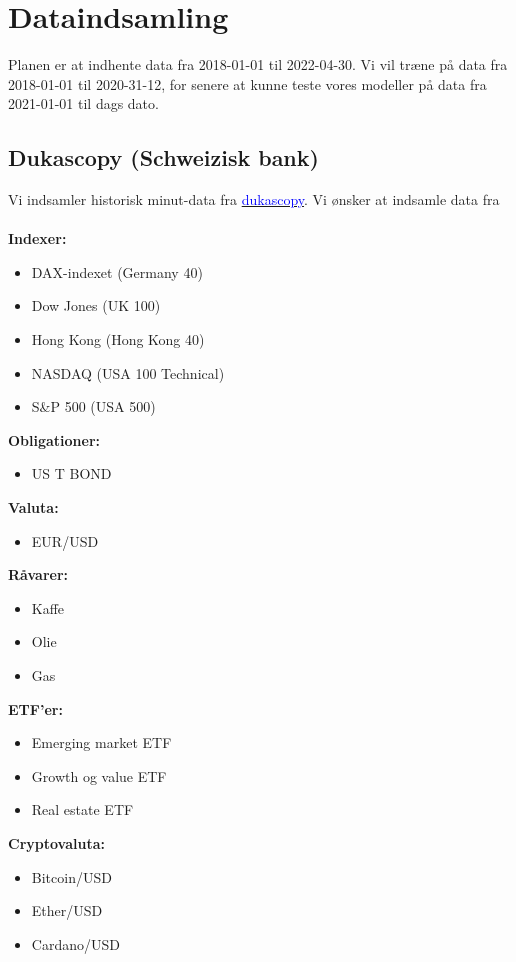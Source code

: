 \documentclass[a4paper,danish,12pt]{article}
\date{\displaydate{date}}
\begin{document}
\tableofcontents
\newpage




\section{Dataindsamling}
Planen er at indhente data fra 2018-01-01 til 2022-04-30. Vi vil træne på data fra 2018-01-01 til 2020-31-12, for senere at kunne teste vores modeller på data fra 2021-01-01 til dags dato.

\subsection*{Dukascopy (Schweizisk bank)}
Vi indsamler historisk minut-data fra \href{https://www.dukascopy.com/swiss/english/marketwatch/historical/}{\textcolor{blue}{dukascopy}}. Vi ønsker at indsamle data fra\\
\\
\textbf{Indexer:}
\begin{itemize}
\item DAX-indexet (Germany 40)
\item Dow Jones (UK 100)
\item Hong Kong (Hong Kong 40)
\item NASDAQ (USA 100 Technical)
\item S\&P 500 (USA 500)
\end{itemize}
\textbf{Obligationer:}
\begin{itemize}
\item US T BOND
\end{itemize}
\textbf{Valuta:}
\begin{itemize}
\item EUR/USD
\end{itemize}
\textbf{Råvarer:}
\begin{itemize}
\item Kaffe
\item Olie
\item Gas
\end{itemize}
\textbf{ETF'er:}
\begin{itemize}
\item Emerging market ETF
\item Growth og value ETF
\item Real estate ETF
\end{itemize}
\textbf{Cryptovaluta:}
\begin{itemize}
\item Bitcoin/USD
\item Ether/USD
\item Cardano/USD
\end{itemize}
\end{document}
